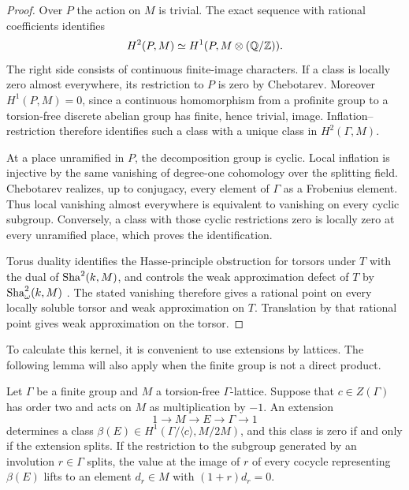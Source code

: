 \begin{proof}
Over \(P\) the action on \(M\) is trivial.  The exact sequence with
rational coefficients identifies
\[
 H^2(P,M)\simeq H^1(P,M\otimes(\mathbb Q/\mathbb Z)).
\]
The right side consists of continuous finite-image characters.
If a class is locally zero almost everywhere, its restriction to
\(P\) is zero by Chebotarev.  Moreover
\(H^1(P,M)=0\), since a continuous homomorphism from a profinite
group to a torsion-free discrete abelian group has finite, hence
trivial, image.  Inflation--restriction therefore identifies such
a class with a unique class in \(H^2(\Gamma,M)\).

At a place unramified in \(P\), the decomposition group is cyclic.
Local inflation is injective by the same vanishing of degree-one
cohomology over the splitting field.  Chebotarev realizes, up to
conjugacy, every element of \(\Gamma\) as a Frobenius element.
Thus local vanishing almost everywhere is equivalent to vanishing
on every cyclic subgroup.  Conversely, a class with those cyclic
restrictions zero is locally zero at every unramified place, which
proves the identification.

Torus duality identifies the Hasse-principle obstruction for torsors
under \(T\) with the dual of \(\operatorname{Sha}^2(k,M)\), and controls the weak
approximation defect of \(T\) by \(\operatorname{Sha}_\omega^2(k,M)\)
\cite[Proposition 9.8 and Corollary 8.14]{Sansuc}.
The stated vanishing therefore gives
a rational point on every locally soluble torsor and weak
approximation on \(T\).  Translation by that rational point gives
weak approximation on the torsor.
\end{proof}

To calculate this kernel, it is convenient to use extensions by
lattices.  The following lemma will also apply when the finite
group is not a direct product.

\begin{lemma}\label{lem:foundations-sign-extension}
Let \(\Gamma\) be a finite group and \(M\) a torsion-free
\(\Gamma\)-lattice.  Suppose that \(c\in Z(\Gamma)\) has order two
and acts on \(M\) as multiplication by \(-1\).
An extension
\[
       1\longrightarrow M\longrightarrow E
        \longrightarrow\Gamma\longrightarrow1
\]
determines a class
\(\beta(E)\in H^1(\Gamma/\langle c\rangle,M/2M)\), and this class
is zero if and only if the extension splits.
If the restriction to the subgroup generated by an involution
\(r\in\Gamma\) splits, the value at the image of \(r\) of every
cocycle representing \(\beta(E)\) lifts to an element
\(d_r\in M\) with \((1+r)d_r=0\).
\end{lemma}

